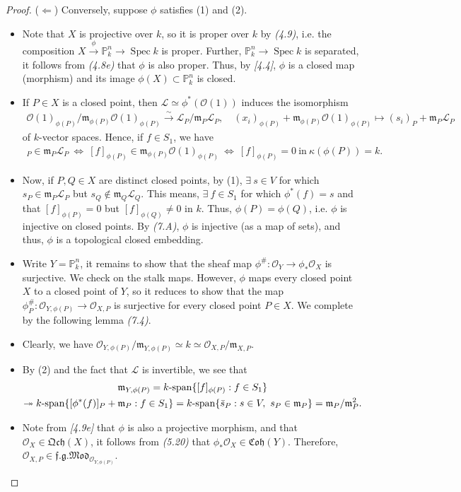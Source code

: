 \documentclass[11pt,a4paper,footinclude=true,headinclude=true]{scrbook} %
\DeclareMathOperator{\Spec}{Spec}
\newcommand{\LL}{\mathscr{L}}
\newcommand{\OO}{\mathcal{O}}
\newcommand{\PP}{\mathbb{P}}
\newcommand{\mm}{\mathfrak{m}}
\newcommand{\<}{\langle}
\newcommand{\>}{\rangle}
\newcommand{\isolongto}{\overset{\sim}{\longrightarrow}}
\newcommand{\spn}{\mathchar`-\mathrm{span}}
\newcommand{\fg}{\mathfrak{f.g.}}
\newcommand{\MOD}{\mathfrak{Mod}}
\newcommand{\qcoh}{\mathfrak{Qch}}
\newcommand{\coh}{\mathfrak{Coh}}
\begin{document}
\begin{proof}
    ($\Leftarrow$) Conversely, suppose $\phi$ satisfies (1) and (2).
    \begin{itemize}
        \item Note that $X$ is projective over $k$, so it is proper over $k$ by \textit{(4.9)}, i.e. the composition $X\xrightarrow{\phi}\PP_k^n\to\Spec k$ is proper. Further, $\PP_k^n\to\Spec k$ is separated, it follows from \textit{(4.8e)} that $\phi$ is also proper. Thus, by \textit{[4.4]}, $\phi$ is a closed map (morphism) and its image $\phi(X)\subset\PP_k^n$ is closed.
        \item If $P\in X$ is a closed point, then $\LL\simeq\phi^\ast(\OO(1))$ induces the isomorphism
        \begin{align*}
            \OO(1)_{\phi(P)}/\mm_{\phi(P)}\OO(1)_{\phi(P)}\isolongto\LL_P/\mm_P\LL_P,\quad(x_i)_{\phi(P)}+\mm_{\phi(P)}\OO(1)_{\phi(P)}\longmapsto(s_i)_P+\mm_P\LL_P
        \end{align*}
        of $k$-vector spaces. Hence, if $f\in S_1$, we have
        \begin{align*}
            [\phi^\ast(f)]_P\in\mm_P\LL_P\ \Longleftrightarrow\ [f]_{\phi(P)}\in\mm_{\phi(P)}\OO(1)_{\phi(P)}\ \Longleftrightarrow\ [f]_{\phi(P)}=0\ \text{in}\ \kappa(\phi(P))=k.
        \end{align*}
        \item Now, if $P,Q\in X$ are distinct closed points, by (1), $\exists\ s\in V$ for which $s_P\in\mm_P\LL_P$ but $s_Q\notin\mm_Q\LL_Q$. This means, $\exists\ f\in S_1$ for which $\phi^\ast(f)=s$ and that $[f]_{\phi(P)}=0$ but $[f]_{\phi(Q)}\neq0$ in $k$. Thus, $\phi(P)=\phi(Q)$, i.e. $\phi$ is injective on closed points. By \textit{(7.A)}, $\phi$ is injective (as a map of sets), and thus, $\phi$ is a topological closed embedding.
        \item Write $Y=\PP_k^n$, it remains to show that the sheaf map $\phi^\#:\OO_Y\to\phi_\ast\OO_X$ is surjective. We check on the stalk maps. However, $\phi$ maps every closed point $X$ to a closed point of $Y$, so it reduces to show that the map $\phi_P^\#:\OO_{Y,\phi(P)}\to\OO_{X,P}$ is surjective for every closed point $P\in X$. We complete by the following lemma \textit{(7.4)}. 
        \item[(i)] Clearly, we have $\OO_{Y,\phi(P)}/\mm_{Y,\phi(P)}\simeq k\simeq\OO_{X,P}/\mm_{X,P}$.
        \item[(ii)] By (2) and the fact that $\LL$ is invertible, we see that
        \begin{multline*}
            \mm_{Y,\phi(P)}=k\spn\{[f]_{\phi(P)}:f\in S_1\}\\ \twoheadrightarrow
            k\spn\{[\phi^\ast(f)]_P+\mm_P:f\in S_1\}
            =k\spn\{\bar{s}_P:s\in V,\ s_P\in\mm_P\}=\mm_P/\mm_P^2.
        \end{multline*}
        \item[(iii)] Note from \textit{[4.9e]} that $\phi$ is also a projective morphism, and that $\OO_X\in\qcoh(X)$, it follows from \textit{(5.20)} that $\phi_\ast\OO_X\in\coh(Y)$. Therefore, $\OO_{X,P}\in\fg\MOD_{\OO_{Y,\phi(P)}}$.
    \end{itemize}
\end{proof}
\end{document}
